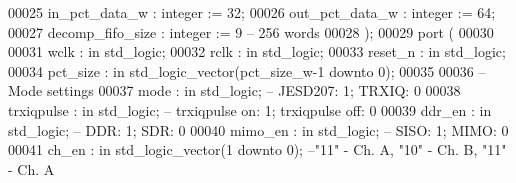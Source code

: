 \begin{DoxyCode}
00025       \textcolor{vhdlchar}{in_pct_data_w}     \textcolor{vhdlchar}{:} \textcolor{comment}{integer} \textcolor{vhdlchar}{:=} \textcolor{vhdllogic}{}\textcolor{vhdllogic}{32};
00026       \textcolor{vhdlchar}{out_pct_data_w}    \textcolor{vhdlchar}{:} \textcolor{comment}{integer} \textcolor{vhdlchar}{:=} \textcolor{vhdllogic}{}\textcolor{vhdllogic}{64};
00027       \textcolor{vhdlchar}{decomp_fifo_size}  \textcolor{vhdlchar}{:} \textcolor{comment}{integer} \textcolor{vhdlchar}{:=} \textcolor{vhdllogic}{}\textcolor{vhdllogic}{9}\textcolor{keyword}{ -- 256 words}
00028    \textcolor{vhdlchar}{)};
00029    \textcolor{keywordflow}{port} \textcolor{vhdlchar}{(}
00030 
00031       \textcolor{vhdlchar}{wclk}              \textcolor{vhdlchar}{:} \textcolor{keywordflow}{in} \textcolor{comment}{std\_logic};
00032       \textcolor{vhdlchar}{rclk}              \textcolor{vhdlchar}{:} \textcolor{keywordflow}{in} \textcolor{comment}{std\_logic};
00033       \textcolor{vhdlchar}{reset_n}           \textcolor{vhdlchar}{:} \textcolor{keywordflow}{in} \textcolor{comment}{std\_logic};
00034       \textcolor{vhdlchar}{pct_size}          \textcolor{vhdlchar}{:} \textcolor{keywordflow}{in} \textcolor{comment}{std\_logic\_vector}\textcolor{vhdlchar}{(}\textcolor{vhdlchar}{pct_size_w}\textcolor{vhdlchar}{-}\textcolor{vhdllogic}{}\textcolor{vhdllogic}{1} \textcolor{keywordflow}{downto} \textcolor{vhdllogic}{}\textcolor{vhdllogic}{0}\textcolor{vhdlchar}{)};
00035       
00036 \textcolor{keyword}{      --Mode settings}
00037       \textcolor{vhdlchar}{mode}                \textcolor{vhdlchar}{:} \textcolor{keywordflow}{in} \textcolor{comment}{std\_logic};\textcolor{keyword}{ -- JESD207: 1; TRXIQ: 0}
00038         \textcolor{vhdlchar}{trxiqpulse}        \textcolor{vhdlchar}{:} \textcolor{keywordflow}{in} \textcolor{comment}{std\_logic};\textcolor{keyword}{ -- trxiqpulse on: 1; trxiqpulse off: 0}
00039         \textcolor{vhdlchar}{ddr_en}            \textcolor{vhdlchar}{:} \textcolor{keywordflow}{in} \textcolor{comment}{std\_logic};\textcolor{keyword}{ -- DDR: 1; SDR: 0}
00040         \textcolor{vhdlchar}{mimo_en}           \textcolor{vhdlchar}{:} \textcolor{keywordflow}{in} \textcolor{comment}{std\_logic};\textcolor{keyword}{ -- SISO: 1; MIMO: 0}
00041         \textcolor{vhdlchar}{ch_en}                 \textcolor{vhdlchar}{:} \textcolor{keywordflow}{in} \textcolor{comment}{std\_logic\_vector}\textcolor{vhdlchar}{(}\textcolor{vhdllogic}{}\textcolor{vhdllogic}{1} \textcolor{keywordflow}{downto} \textcolor{vhdllogic}{}\textcolor{vhdllogic}{0}\textcolor{vhdlchar}{)};\textcolor{keyword}{ --"11" - Ch. A, "10" - Ch. B, "11" - Ch. A
}
\end{DoxyCode}
